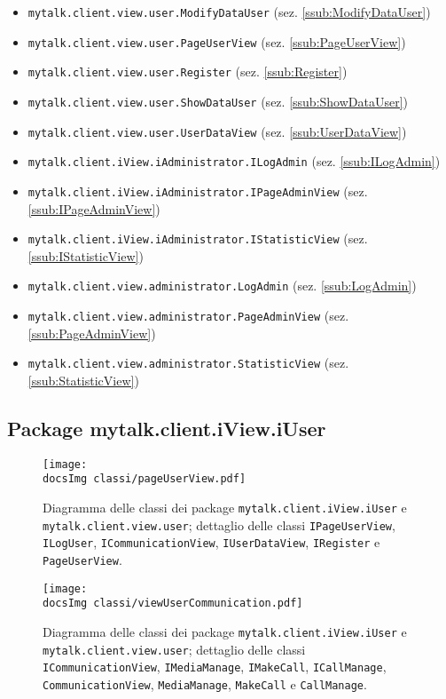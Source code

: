 {\begin{itemize}
	\item[] \texttt{mytalk.client.view.user.ModifyDataUser} (sez. \ref{ssub:ModifyDataUser})
	\item[] \texttt{mytalk.client.view.user.PageUserView} (sez. \ref{ssub:PageUserView})
	\item[] \texttt{mytalk.client.view.user.Register} (sez. \ref{ssub:Register})
	\item[] \texttt{mytalk.client.view.user.ShowDataUser} (sez. \ref{ssub:ShowDataUser})
	\item[] \texttt{mytalk.client.view.user.UserDataView} (sez. \ref{ssub:UserDataView})
	\item[] \texttt{mytalk.client.iView.iAdministrator.ILogAdmin} (sez. \ref{ssub:ILogAdmin})
	\item[] \texttt{mytalk.client.iView.iAdministrator.IPageAdminView} (sez. \ref{ssub:IPageAdminView})
	\item[] \texttt{mytalk.client.iView.iAdministrator.IStatisticView} (sez. \ref{ssub:IStatisticView})
	\item[] \texttt{mytalk.client.view.administrator.LogAdmin} (sez. \ref{ssub:LogAdmin})
	\item[] \texttt{mytalk.client.view.administrator.PageAdminView} (sez. \ref{ssub:PageAdminView})
	\item[] \texttt{mytalk.client.view.administrator.StatisticView} (sez. \ref{ssub:StatisticView})
\end{itemize}


\begin{sloppypar}
	\subsection{Package mytalk.client.iView.iUser}{
	
	\begin{figure}[h!tbp]
		\centering
		\texttt{[image: \\docsImg classi/pageUserView.pdf]}
		\caption{Diagramma delle classi dei package \nolinkurl{mytalk.client.iView.iUser} e \nolinkurl{mytalk.client.view.user}; dettaglio delle classi \nolinkurl{IPageUserView},  \nolinkurl{ILogUser}, \nolinkurl{ICommunicationView}, \nolinkurl{IUserDataView},  \nolinkurl{IRegister} e \nolinkurl{PageUserView}.}
	\end{figure}

	\begin{figure}[h!tbp]
		\centering
		\texttt{[image: \\docsImg classi/viewUserCommunication.pdf]}
		\caption{Diagramma delle classi dei package \nolinkurl{mytalk.client.iView.iUser} e \nolinkurl{mytalk.client.view.user}; dettaglio delle classi \nolinkurl{ICommunicationView}, \nolinkurl{IMediaManage}, \nolinkurl{IMakeCall}, \nolinkurl{ICallManage}, \nolinkurl{CommunicationView}, \nolinkurl{MediaManage}, \nolinkurl{MakeCall} e \nolinkurl{CallManage}.}
	\end{figure}
	
}
\end{sloppypar}}
